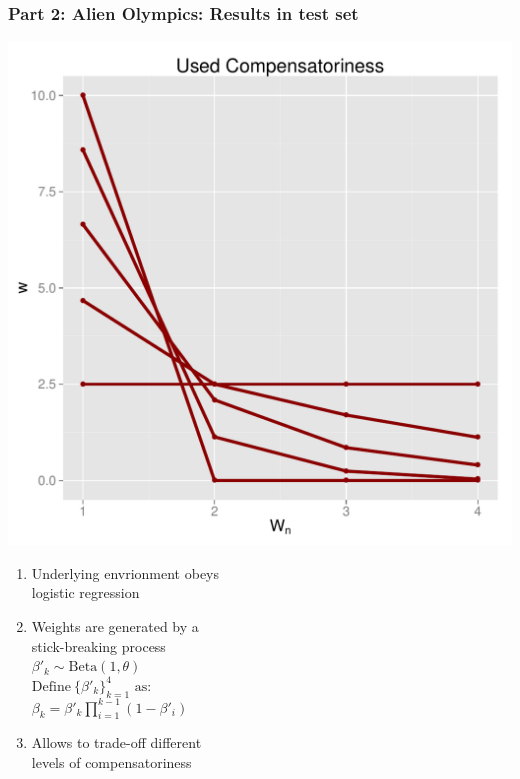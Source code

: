 \documentclass{beamer}
\begin{document}
\begin{frame}
    \frametitle{Part 2: Alien Olympics:  Results in test set}
\hfill \includegraphics[scale=0.25]{comp.pdf}\vspace{-5cm}
\begin{enumerate}
\item Underlying envrionment obeys\\ logistic regression
\item Weights are generated by a\\ stick-breaking process\\
$\beta'_k \sim \text{Beta}(1,\theta)$\\
$\text{Define}~ \{\beta'_k\}^4_{k=1}\text{ as:}$\\
$\beta_k=\beta'_k\prod_{i=1}^{k-1}(1-\beta'_i) $
\item Allows to trade-off different\\ levels of compensatoriness
\end{enumerate}
\end{frame}
\end{document}
